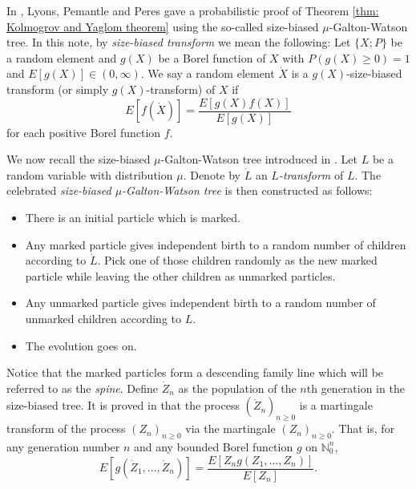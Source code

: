 \documentclass[12pt,a4paper]{amsart}
\numberwithin{equation}{section}
\begin{document}
	In \cite{lyons1995conceptual}, Lyons, Pemantle and Peres gave a probabilistic proof of Theorem \ref{thm: Kolmogrov and Yaglom theorem} using the so-called size-biased $\mu$-Galton-Watson tree.
	In this note, by \emph{size-biased transform} we mean the following:
	Let $\{X;P\}$ be a random element and $g(X)$ be a Borel function of $X$ with $P(g(X) \geq 0) = 1$ and %
	$E[g(X)]\in (0,\infty)$.
	We say a random element $\dot X$ is a $g(X)$-size-biased transform (or simply $g(X)$-transform) of $X$ if
	\[
		E[f(\dot X)] = \frac{ E[g(X)f(X)]}{E[g(X)]}
	\]
	for each positive Borel function $f$.

	We now recall the size-biased $\mu$-Galton-Watson tree introduced in \cite{lyons1995conceptual}.
	Let $L$ be a random variable with distribution $\mu$.
   Denote by $\dot L$ an \emph{$L$-transform} of $L$.
	The celebrated \emph{size-biased $\mu$-Galton-Watson tree} is then constructed as follows:
\begin{itemize}
\item
	There is an initial particle which is marked.
\item
	Any marked particle gives independent birth to a random number of children according to $\dot L$. Pick one of those children randomly as the new marked particle while leaving the other children as unmarked particles.
\item
	Any unmarked particle gives independent birth to a random number of unmarked children according to $L$.
\item
	The evolution goes on.
\end{itemize}

	Notice that the marked particles form a descending family line which will be referred to as the \emph{spine}.
	Define $\dot Z_n$ as the population of the $n$th generation in the size-biased tree.
	It is proved in \cite{lyons1995conceptual} that the process $(\dot Z_n)_{n\ge 0}$ is a martingale transform of the process $(Z_n)_{n\ge 0}$ via the martingale $(Z_n)_{n\ge 0}.$
	That is, for any generation number $n$ and any bounded Borel function $g$ on $\mathbb N_0^{n}$,
\begin{equation}
\label{eq:htransformation}
	E [ g ( \dot Z_1, \dots, \dot Z_n) ]
	= \frac { E[ Z_n g( Z_1, \dots, Z_n)]} {E [ Z_n]}.
\end{equation}
\end{document}
